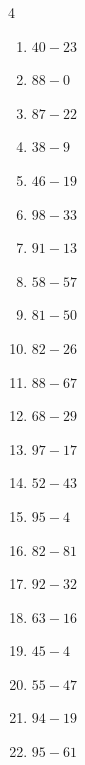 \begin{multicols}{4}
\begin{enumerate}
\columnbreak %

  \item $40-23$
        \phantom{$=17$}

  \item $88-0$
        \phantom{$=88$}

  \item $87-22$
        \phantom{$=65$}

  \item $38-9$
        \phantom{$=29$}

  \item $46-19$
        \phantom{$=27$}

  \item $98-33$
        \phantom{$=65$}

  \item $91-13$
        \phantom{$=78$}

  \item $58-57$
        \phantom{$=1$}

  \item $81-50$
        \phantom{$=31$}

  \item $82-26$
        \phantom{$=56$}

  \item $88-67$
        \phantom{$=21$}

  \item $68-29$
        \phantom{$=39$}

  \item $97-17$
        \phantom{$=80$}

  \item $52-43$
        \phantom{$=9$}

  \item $95-4$
        \phantom{$=91$}

  \item $82-81$
        \phantom{$=1$}

  \item $92-32$
        \phantom{$=60$}

  \item $63-16$
        \phantom{$=47$}

  \item $45-4$
        \phantom{$=41$}

  \item $55-47$
        \phantom{$=8$}

  \item $94-19$
        \phantom{$=75$}

  \item $95-61$
        \phantom{$=34$}


\end{enumerate}
\end{multicols}
